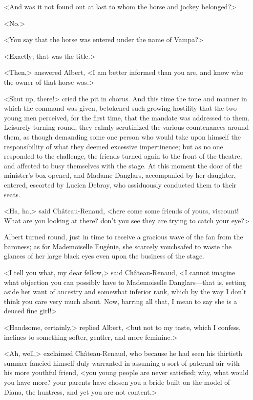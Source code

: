  <And was it not found out at last to whom the horse and jockey belonged?> 

 <No.> 

 <You say that the horse was entered under the name of Vampa?> 

 <Exactly; that was the title.> 

 <Then,> answered Albert, <I am better informed than you are, and know who the owner of that horse was.> 

 <Shut up, there!> cried the pit in chorus. And this time the tone and manner in which the command was given, betokened such growing hostility that the two young men perceived, for the first time, that the mandate was addressed to them. Leisurely turning round, they calmly scrutinized the various countenances around them, as though demanding some one person who would take upon himself the responsibility of what they deemed excessive impertinence; but as no one responded to the challenge, the friends turned again to the front of the theatre, and affected to busy themselves with the stage. At this moment the door of the minister's box opened, and Madame Danglars, accompanied by her daughter, entered, escorted by Lucien Debray, who assiduously conducted them to their seats. 

 <Ha, ha,> said Château-Renaud, <here come some friends of yours, viscount! What are you looking at there? don't you see they are trying to catch your eye?> 

 Albert turned round, just in time to receive a gracious wave of the fan from the baroness; as for Mademoiselle Eugénie, she scarcely vouchsafed to waste the glances of her large black eyes even upon the business of the stage. 

 <I tell you what, my dear fellow,> said Château-Renaud, <I cannot imagine what objection you can possibly have to Mademoiselle Danglars—that is, setting aside her want of ancestry and somewhat inferior rank, which by the way I don't think you care very much about. Now, barring all that, I mean to say she is a deuced fine girl!> 

 <Handsome, certainly,> replied Albert, <but not to my taste, which I confess, inclines to something softer, gentler, and more feminine.> 

 <Ah, well,> exclaimed Château-Renaud, who because he had seen his thirtieth summer fancied himself duly warranted in assuming a sort of paternal air with his more youthful friend, <you young people are never satisfied; why, what would you have more? your parents have chosen you a bride built on the model of Diana, the huntress, and yet you are not content.> 

